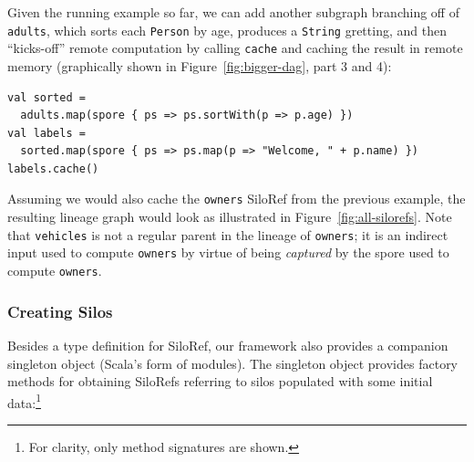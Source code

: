 \documentclass[preprint]{sigplanconf}
\theoremstyle{definition}
\theoremstyle{definition}
\begin{document}
Given the running example so far, we can add another subgraph branching off of
\verb|adults|, which sorts each \verb|Person| by age, produces a \verb|String|
gretting, and then ``kicks-off'' remote computation by calling \verb|cache|
and caching the result in remote memory (graphically shown in Figure~\ref{fig:bigger-dag},
part 3 and 4):

\begin{lstlisting}
val sorted =
  adults.map(spore { ps => ps.sortWith(p => p.age) })
val labels =
  sorted.map(spore { ps => ps.map(p => "Welcome, " + p.name) })
labels.cache()
\end{lstlisting}
\noindent
Assuming we would also cache the \verb|owners| SiloRef from the previous
example, the resulting lineage graph would look as illustrated in
Figure~\ref{fig:all-silorefs}. Note that \verb|vehicles| is not a regular
parent in the lineage of \verb|owners|; it is an indirect input used to
compute \verb|owners| by virtue of being {\em captured} by the spore used to
compute \verb|owners|.






\subsubsection{Creating Silos}
\label{sec:creating-silos}

Besides a type definition for SiloRef, our framework also provides a companion
singleton object (Scala's form of modules). The singleton object provides
factory methods for obtaining SiloRefs referring to silos populated with some
initial data:\footnote{For clarity, only method signatures are shown.}
\end{document}
